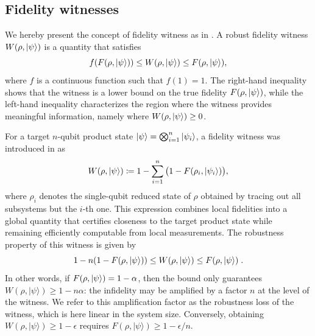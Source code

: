 \documentclass[a4paper,twocolumn,11pt,unpublished]{quantumarticle}
\begin{document}
\subsection{Fidelity witnesses}
\label{subsection:prelims:witness}
We hereby present the concept of fidelity witness as in \cite{CGKM21efficient, UC24efficient}. A {robust fidelity witness} $W(\rho, \ket{\psi})$ is a quantity that satisfies
\begin{equation}
\label{eq: robust fidelity witness}
    f(F(\rho, \ket{\psi}))
    \leq W(\rho, \ket{\psi}) 
    \leq F(\rho, \ket{\psi}) ,
\end{equation}
where $f$ is a continuous function such that $f(1) = 1$. 
The right-hand inequality shows that the witness is a {lower bound} on the true fidelity $F(\rho, \ket{\psi})$, while the left-hand inequality characterizes the region where the witness provides meaningful information, namely where $W(\rho, \ket{\psi}) \ge 0$.

For a target $n$-qubit product state $\ket{\psi}=\bigotimes_{i=1}^n\ket{\psi_i}$, a fidelity witness was introduced in \cite{CGKM21efficient} as
\begin{equation}
    \label{eq:prelims:witness}
    W(\rho, \ket{\psi}) 
    \coloneqq 1 - 
    \sum_{i=1}^{n}
    \big(1 - F(\rho_i, \ket{\psi_i})\big),
\end{equation}
where $\rho_i$ denotes the single-qubit reduced state of $\rho$ obtained by tracing out all subsystems but the $i$-th one.
This expression combines local fidelities into a global quantity that certifies closeness to the target product state while remaining efficiently computable from local measurements. The {robustness} property of this witness is given by \cite{CGKM21efficient}
\begin{equation}
    \label{eq:prelims:witness:robustness}
    1-n(1-F(\rho, \ket\psi)) \leq W(\rho, \ket\psi)\leq F(\rho, \ket\psi)\; .
\end{equation}
In other words, if $F(\rho,\ket\psi)=1-\alpha$, then the bound only guarantees $W(\rho,|\psi\rangle)\geq 1-n\alpha$: the infidelity may be amplified by a factor $n$ at the level of the witness. We refer to this amplification factor as the robustness loss of the witness, which is here linear in the system size. Conversely, obtaining $W(\rho,|\psi\rangle)\geq 1-\epsilon$ requires $F(\rho,|\psi\rangle)\geq 1-\epsilon/n$.
\end{document}
